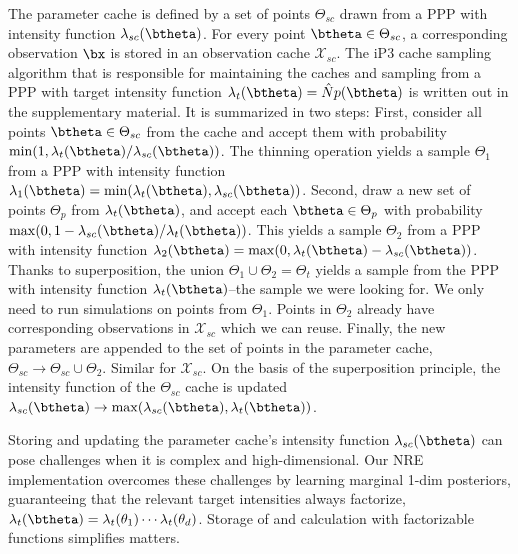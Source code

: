 The parameter cache is defined by a set of points $\Theta_{sc}$ drawn from a PPP with intensity function $\lambda_{sc}(\btheta)$.  For every point $\btheta\in\Theta_{sc}$, a corresponding observation $\bx$ is stored in an observation cache $\mathcal{X}_{sc}$.
The iP3 cache sampling algorithm that is responsible for maintaining the caches and sampling from a PPP with target intensity function $\lambda_t(\btheta) = \hat{N} p(\btheta)$ is written out in the supplementary material.
It is summarized in two steps: First, consider all points $\btheta \in \Theta_{sc}$ from the cache and accept them with probability 
$\min(1, \lambda_t(\btheta)/\lambda_{sc}(\btheta))$.
The thinning operation yields a sample $\Theta_1$ from a PPP with intensity function 
$\lambda_1(\btheta) = \min(\lambda_t(\btheta), \lambda_{sc}(\btheta))$. Second, draw a new set of points $\Theta_p$ from $\lambda_t(\btheta)$, and accept each $\btheta\in\Theta_p$ 
with probability $\max(0, 1-\lambda_{sc}(\btheta)/\lambda_t(\btheta))$.  This yields a sample $\Theta_2$ from a PPP with intensity function $\lambda_2(\btheta) = \max(0, \lambda_t(\btheta) - \lambda_{sc}(\btheta))$.  Thanks to superposition, the union $\Theta_1 \cup \Theta_2 = \Theta_t$ yields a sample from the PPP with intensity function $\lambda_t(\btheta)$--the sample we were looking for. We only need to run simulations on points from $\Theta_1$. Points in $\Theta_2$ already have corresponding observations in $\mathcal{X}_{sc}$ which we can reuse. Finally, the new parameters are appended to the set of points in the parameter cache, $\Theta_{sc} \to \Theta_{sc} \cup \Theta_2$. Similar for $\mathcal{X}_{sc}$. On the basis of the superposition principle, the intensity function of the $\Theta_{sc}$ cache is updated
$\lambda_{sc}(\btheta) \to \max(\lambda_{sc}(\btheta), \lambda_t(\btheta))$.

Storing and updating the parameter cache's intensity function $\lambda_{sc}(\btheta)$ can pose challenges when it is complex and high-dimensional. Our NRE implementation overcomes these challenges by learning marginal 1-dim posteriors, guaranteeing that the relevant target intensities always factorize, $\lambda_t(\btheta) = \lambda_t(\theta_1)\cdots \lambda_t(\theta_d)$. Storage of and calculation with factorizable functions simplifies matters.

\printbibliography